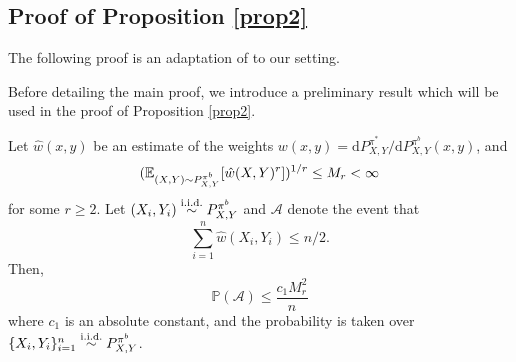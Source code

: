 \subsection{Proof of Proposition \ref{prop2}}
The following proof is an adaptation of \cite[Proposition 1]{lei2020conformal} to our setting.

Before detailing the main proof, we introduce a preliminary result which will be used in the proof of Proposition \ref{prop2}.



\begin{lemma}\label{Aevent}
Let $\hat{w}(x,y)$ be an estimate of the weights $w(x,y) = \mathrm{d}P^{\pi^{*}}_{X,Y}/\mathrm{d}P^{\pi^{b}}_{X,Y}(x,y)$, and $$(\mathbb{E}_{(X,Y)\sim P^{\pi^b}_{X,Y}}[\hat{w}(X,Y)^r])^{1/r} \leq M_r < \infty$$ for some $r \geq 2$. Let $(X_i, Y_i) \overset{\textup{i.i.d.}}{\sim} P^{\pi^b}_{X,Y}$ and $\mathcal{A}$ denote the event that 
\[
\sum_{i=1}^n \hat{w}(X_i, Y_i) \leq n/2.
\]
Then, 
\[
\mathbb{P}(\mathcal{A}) \leq \frac{c_1 M_r^2}{n}
\]
where $c_1$ is an absolute constant, and the probability is taken over $\{X_i, Y_i\}_{i=1}^n  \overset{\textup{i.i.d.}}{\sim} P^{\pi^b}_{X,Y}$.
\end{lemma}

